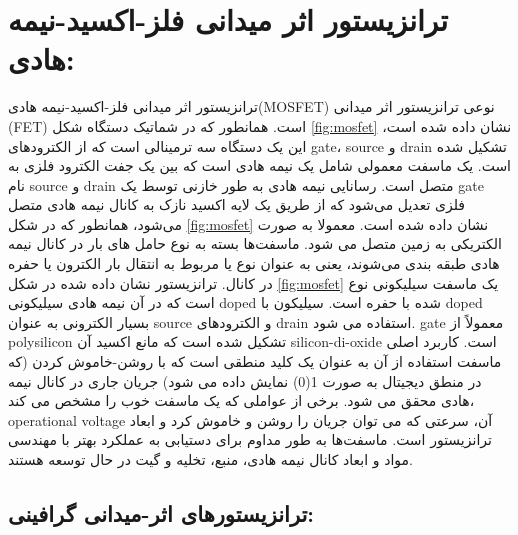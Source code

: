 \section{ترانزیستور اثر میدانی فلز-اکسید-نیمه هادی:}
ترانزیستور اثر میدانی فلز-اکسید-نیمه هادی(\gls{MOSFET}) نوعی ترانزیستور اثر میدانی (\gls{FET}) است. همانطور که در شماتیک دستگاه شکل \ref{fig:mosfet} نشان داده شده است، این یک دستگاه سه ترمینالی است که از الکترودهای \gls{gate}، \gls{source} و \gls{drain} تشکیل شده است. یک ماسفت معمولی شامل یک نیمه هادی است که بین یک جفت الکترود فلزی به نام \gls{source} و \gls{drain} متصل است. رسانایی نیمه هادی به طور خازنی توسط یک \gls{gate} فلزی تعدیل می‌شود که از طریق یک لایه اکسید نازک به کانال نیمه هادی متصل می‌شود، همانطور که در شکل \ref{fig:mosfet} نشان داده شده است. معمولا به صورت الکتریکی به زمین متصل می شود. ماسفت‌ها بسته به نوع حامل های بار در کانال نیمه هادی طبقه بندی می‌شوند، یعنی به عنوان نوع  یا  مربوط به انتقال بار الکترون یا حفره در کانال.
ترانزیستور نشان داده شده در شکل \ref{fig:mosfet} یک ماسفت سیلیکونی نوع  است که در آن نیمه هادی سیلیکونی \gls{doped} شده با حفره است. سیلیکون با \gls{doped} بسیار الکترونی  به عنوان \gls{source} و الکترودهای \gls{drain} استفاده می شود. \gls{gate} معمولاً از \gls{polysilicon} تشکیل شده است که مانع اکسید آن \gls{silicon-di-oxide} است. کاربرد اصلی ماسفت استفاده از آن به عنوان یک کلید منطقی است که با روشن-خاموش کردن (که در منطق دیجیتال به صورت 1(0) نمایش داده می شود) جریان جاری در کانال نیمه هادی محقق می شود. برخی از عواملی که یک ماسفت خوب را مشخص می کند، \gls{operational voltage} آن، سرعتی که می توان جریان را روشن و خاموش کرد و ابعاد ترانزیستور است. ماسفت‌ها به طور مداوم برای دستیابی به عملکرد بهتر با مهندسی مواد و ابعاد کانال نیمه هادی، منبع، تخلیه و گیت در حال توسعه هستند.

\subsection{ترانزیستورهای اثر-میدانی گرافینی:}


